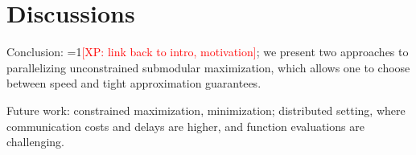 \documentclass{article} %
\newcommand{\Comments}{1}
\newcommand{\note}[2]{\ifnum\Comments=1\textcolor{#1}{#2}\fi}
\newcommand{\xinghao}[1]{\note{red}{[XP: #1]}}
\begin{document}
\section{Discussions}

Conclusion: \xinghao{link back to intro, motivation}; we present two approaches to parallelizing unconstrained submodular maximization, which allows one to choose between speed and tight approximation guarantees.

Future work: constrained maximization, minimization; distributed setting, where communication costs and delays are higher, and function evaluations are challenging.


{\footnotesize




}

\newpage
\appendix



\newpage
\end{document}
